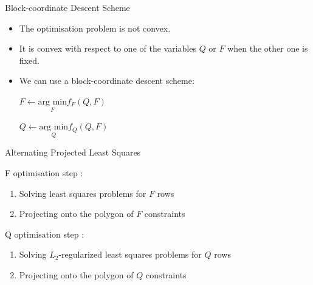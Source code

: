 \documentclass{beamer}\usepackage[]{graphicx}\usepackage[]{color}
\begin{document}

\begin{frame}{Block-coordinate Descent Scheme}

\begin{itemize}

\item The optimisation problem is not convex.

\item It is convex with respect to one of the variables $Q$ or $F$ when the other one is fixed.

\item We can use a block-coordinate descent scheme:

\begin{algorithmic}

$ F \gets \underset{F}{\text{arg min}} f_F(Q,F)$

$ Q \gets \underset{Q}{\text{arg min}} f_Q(Q,F)$

\EndFor
\end{algorithmic}

\end{itemize}

\end{frame}


\begin{frame}{Alternating Projected Least Squares}

F optimisation step : 
\begin{enumerate}
  \item Solving least squares problems for $F$ rows
  \item Projecting onto the polygon of $F$ constraints
\end{enumerate}
Q optimisation step : 
\begin{enumerate}
  \item Solving $L_2$-regularized least squares problems for $Q$ rows
  \item Projecting onto the polygon of $Q$ constraints
\end{enumerate}

\end{frame}

\end{document}
